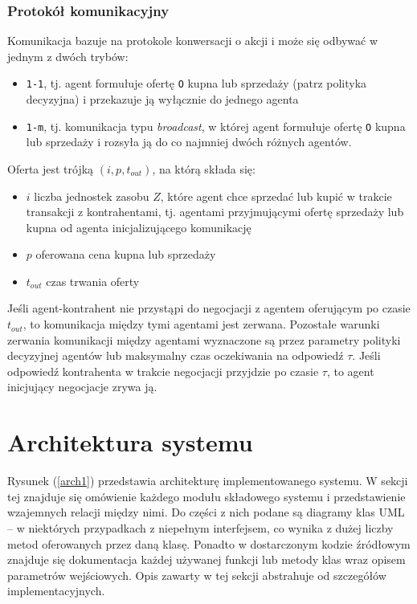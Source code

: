 \documentclass{article}
\providecommand{\tightlist}{%
  \setlength{\itemsep}{0pt}\setlength{\parskip}{0pt}}
\begin{document}
\subsubsection{Protokół komunikacyjny}

Komunikacja bazuje na protokole konwersacji o akcji i może się odbywać w jednym z dwóch trybów:

\begin{itemize}
\tightlist
\item
  \texttt{1-1}, tj. agent formułuje ofertę \texttt{O} kupna lub
  sprzedaży (patrz polityka decyzyjna) i przekazuje ją wyłącznie do
  jednego agenta
\item
  \texttt{1-m}, tj. komunikacja typu \emph{broadcast}, w której agent
  formułuje ofertę \texttt{O} kupna lub sprzedaży i rozsyła ją do co
  najmniej dwóch różnych agentów.
\end{itemize}

Oferta jest trójką \((i, p, t_{out})\), na którą składa się:

\begin{itemize}
\tightlist
\item
  \(i\) liczba jednostek zasobu \(Z\), które agent chce sprzedać lub
  kupić w trakcie transakcji z kontrahentami, tj. agentami przyjmującymi
  ofertę sprzedaży lub kupna od agenta inicjalizującego komunikację
\item
  \(p\) oferowana cena kupna lub sprzedaży
\item
  \(t_{out}\) czas trwania oferty
\end{itemize}

Jeśli agent-kontrahent nie przystąpi do negocjacji z agentem oferującym
po czasie \(t_{out}\), to komunikacja między tymi agentami jest zerwana.
Pozostałe warunki zerwania komunikacji między agentami wyznaczone są
przez parametry polityki decyzyjnej agentów lub maksymalny czas
oczekiwania na odpowiedź \(\tau\). Jeśli odpowiedź kontrahenta w trakcie
negocjacji przyjdzie po czasie \(\tau\), to agent inicjujący negocjacje
zrywa ją.

\newpage

\section{Architektura systemu \label{sec2}}

Rysunek (\ref{arch1}) przedstawia architekturę implementowanego systemu. W sekcji tej znajduje się 
omówienie każdego modułu składowego systemu i przedstawienie wzajemnych relacji między nimi.
Do części z nich podane są diagramy klas UML -- w niektórych przypadkach z niepełnym interfejsem,
co wynika z dużej liczby metod oferowanych przez daną klasę. Ponadto w dostarczonym kodzie źródłowym 
znajduje się dokumentacja każdej używanej funkcji lub metody klas wraz opisem parametrów wejściowych.
Opis zawarty w tej sekcji abstrahuje od szczegółów implementacyjnych.
\end{document}
